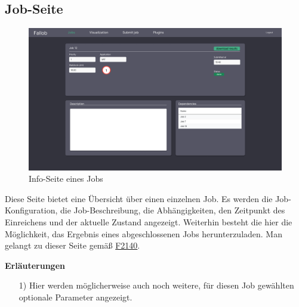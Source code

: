 \subsection{Job-Seite}
\label{pages:job-page}
\begin{figure}[H]
    \centering
    \includegraphics[width=\textwidth]{images-interface/v4_interface/job_info_page_4.pdf}
    \caption{Info-Seite eines Jobs}
    \label{fig:job-page}
\end{figure}
Diese Seite bietet eine Übersicht über einen einzelnen Job. Es werden die Job-Konfiguration, die Job-Beschreibung, die Abhängigkeiten, den Zeitpunkt des Einreichens und der aktuelle Zustand angezeigt. Weiterhin besteht die hier die Möglichkeit, das Ergebnis eines abgeschlossenen Jobs herunterzuladen. Man gelangt zu dieser Seite gemäß \hyperref[FA:Web-Interface:Einsehen von Job-Informationen]{F2140}.

\textbf{Erläuterungen}
\begin{itemize}
    \item[1)] Hier werden möglicherweise auch noch weitere, für diesen Job gewählten optionale Parameter angezeigt.
\end{itemize}

\newpage
